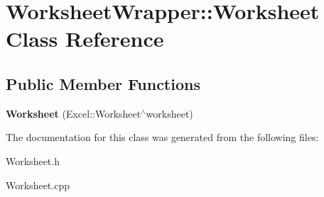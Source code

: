 \hypertarget{class_worksheet_wrapper_1_1_worksheet}{}\section{Worksheet\+Wrapper\+:\+:Worksheet Class Reference}
\label{class_worksheet_wrapper_1_1_worksheet}
\subsection*{Public Member Functions}
\begin{DoxyCompactItemize}
\item 
\hypertarget{class_worksheet_wrapper_1_1_worksheet_a2e80e974c1425e77f3a26e74324c6fab}{}{\bfseries Worksheet} (Excel\+::\+Worksheet$^\wedge$worksheet)\label{class_worksheet_wrapper_1_1_worksheet_a2e80e974c1425e77f3a26e74324c6fab}

\end{DoxyCompactItemize}


The documentation for this class was generated from the following files\+:\begin{DoxyCompactItemize}
\item 
Worksheet.\+h\item 
Worksheet.\+cpp\end{DoxyCompactItemize}
